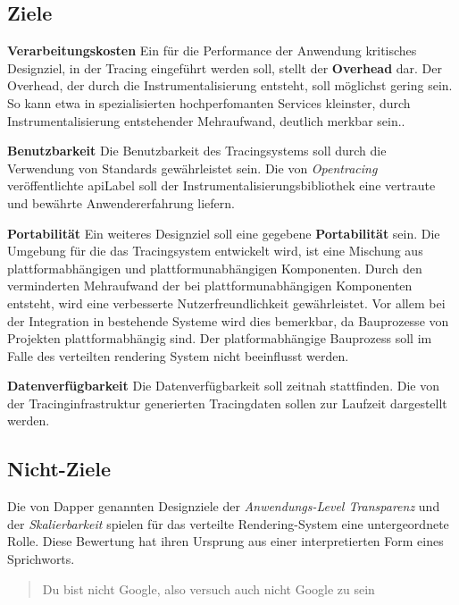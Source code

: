 \subsection{Ziele}
\label{subsection:Ziele}
\textbf{Verarbeitungskosten} \space\space\space Ein für die Performance der Anwendung kritisches Designziel, in der Tracing eingeführt werden soll, stellt der \textbf{Overhead} dar. Der Overhead, der durch die Instrumentalisierung entsteht, soll möglichst gering sein. So kann etwa in spezialisierten hochperfomanten Services kleinster, durch Instrumentalisierung entstehender Mehraufwand, deutlich merkbar sein.. 

\textbf{Benutzbarkeit} \space\space\space Die Benutzbarkeit des Tracingsystems soll durch die Verwendung von Standards gewährleistet sein. Die von \emph{Opentracing} veröffentlichte \gls{apiLabel} soll der Instrumentalisierungsbibliothek eine vertraute und bewährte Anwendererfahrung liefern. 

\textbf{Portabilität} \space\space\space Ein weiteres Designziel soll eine gegebene \textbf{Portabilität} sein. Die Umgebung für die das Tracingsystem entwickelt wird, ist eine Mischung aus plattformabhängigen und plattformunabhängigen Komponenten. Durch den verminderten Mehraufwand der bei plattformunabhängigen Komponenten entsteht, wird eine verbesserte Nutzerfreundlichkeit gewährleistet. Vor allem bei der Integration in bestehende Systeme wird dies bemerkbar, da Bauprozesse von Projekten plattformabhängig sind. Der platformabhängige Bauprozess soll im Falle des verteilten rendering System nicht beeinflusst werden. 

\textbf{Datenverfügbarkeit} \space\space\space Die Datenverfügbarkeit soll zeitnah stattfinden. Die von der Tracinginfrastruktur generierten Tracingdaten sollen zur Laufzeit dargestellt werden. 

\subsection{Nicht-Ziele}
\label{subsection:Nicht-Ziele}

Die von Dapper genannten Designziele der \emph{Anwendungs-Level Transparenz} und der \emph{Skalierbarkeit} spielen für das verteilte Rendering-System eine untergeordnete Rolle. Diese Bewertung hat ihren Ursprung aus einer interpretierten Form eines Sprichworts. 

\begin{quote}
	\cbstart
	Du bist nicht Google, also versuch auch nicht Google zu sein
	\cbend
\end{quote}

